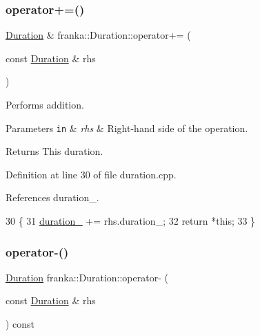 \subsubsection{\texorpdfstring{operator+=()}{operator+=()}}
{\footnotesize\ttfamily \hyperlink{classfranka_1_1Duration}{Duration} \& franka\+::\+Duration\+::operator+= (\begin{DoxyParamCaption}\item[{const \hyperlink{classfranka_1_1Duration}{Duration} \&}]{rhs }\end{DoxyParamCaption})\hspace{0.3cm}{\ttfamily [noexcept]}}

Performs addition.


\begin{DoxyParams}[1]{Parameters}
\mbox{\tt in}  & {\em rhs} & Right-\/hand side of the operation.\\
\hline
\end{DoxyParams}
\begin{DoxyReturn}{Returns}
This duration. 
\end{DoxyReturn}


Definition at line 30 of file duration.\+cpp.



References duration\+\_\+.


\begin{DoxyCode}
30                                                            \{
31   \hyperlink{classfranka_1_1Duration_ae446c403b200f0dbf92fb51ca21e82ff}{duration\_} += rhs.duration\_;
32   \textcolor{keywordflow}{return} *\textcolor{keyword}{this};
33 \}
\end{DoxyCode}
\mbox{\label{classfranka_1_1Duration_a2a3bc1a8278b91bebe88d7498d410de9}} 
\subsubsection{\texorpdfstring{operator-\/()}{operator-()}}
{\footnotesize\ttfamily \hyperlink{classfranka_1_1Duration}{Duration} franka\+::\+Duration\+::operator-\/ (\begin{DoxyParamCaption}\item[{const \hyperlink{classfranka_1_1Duration}{Duration} \&}]{rhs }\end{DoxyParamCaption}) const\hspace{0.3cm}{\ttfamily [noexcept]}}

